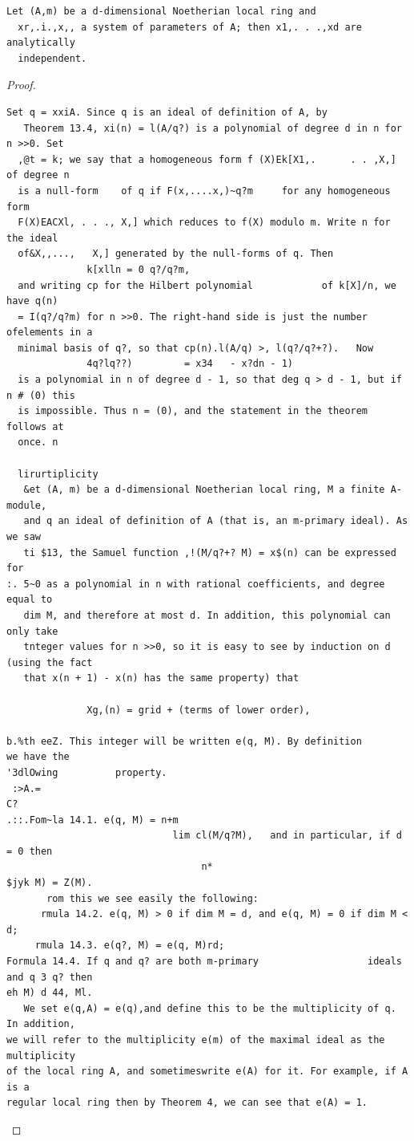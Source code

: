 \begin{theorem}\label{mcrt-auto-theorem-14-5}\uses{}
\begin{verbatim}
Let (A,m) be a d-dimensional Noetherian local ring and
  xr,.i.,x,, a system of parameters of A; then x1,. . .,xd are analytically
  independent.
\end{verbatim}
\end{theorem}
\begin{proof}
\begin{verbatim}
Set q = xxiA. Since q is an ideal of definition of A, by
   Theorem 13.4, xi(n) = l(A/q?) is a polynomial of degree d in n for n >>0. Set
  ,@t = k; we say that a homogeneous form f (X)Ek[X1,.      . . ,X,] of degree n
  is a null-form    of q if F(x,....x,)~q?m     for any homogeneous form
  F(X)EACXl, . . ., X,] which reduces to f(X) modulo m. Write n for the ideal
  of&X,,...,   X,] generated by the null-forms of q. Then
              k[xlln = 0 q?/q?m,
  and writing cp for the Hilbert polynomial            of k[X]/n, we have q(n)
  = I(q?/q?m) for n >>0. The right-hand side is just the number ofelements in a
  minimal basis of q?, so that cp(n).l(A/q) >, l(q?/q?+?).   Now
              4q?lq??)         = x34   - x?dn - 1)
  is a polynomial in n of degree d - 1, so that deg q > d - 1, but if n # (0) this
  is impossible. Thus n = (0), and the statement in the theorem follows at
  once. n

  lirurtiplicity
   &et (A, m) be a d-dimensional Noetherian local ring, M a finite A-module,
   and q an ideal of definition of A (that is, an m-primary ideal). As we saw
   ti $13, the Samuel function ,!(M/q?+? M) = x$(n) can be expressed for
:. 5~0 as a polynomial in n with rational coefficients, and degree equal to
   dim M, and therefore at most d. In addition, this polynomial can only take
   tnteger values for n >>0, so it is easy to see by induction on d (using the fact
   that x(n + 1) - x(n) has the same property) that

              Xg,(n) = grid + (terms of lower order),

b.%th eeZ. This integer will be written e(q, M). By definition       we have the
'3dlOwing          property.
 :>A.=
C?
.::.Fom~la 14.1. e(q, M) = n+m
                             lim cl(M/q?M),   and in particular, if d = 0 then
                                  n*
$jyk M) = Z(M).
       rom this we see easily the following:
      rmula 14.2. e(q, M) > 0 if dim M = d, and e(q, M) = 0 if dim M < d;
     rmula 14.3. e(q?, M) = e(q, M)rd;
Formula 14.4. If q and q? are both m-primary                   ideals and q 3 q? then
eh M) d 44, Ml.
   We set e(q,A) = e(q),and define this to be the multiplicity of q. In addition,
we will refer to the multiplicity e(m) of the maximal ideal as the multiplicity
of the local ring A, and sometimeswrite e(A) for it. For example, if A is a
regular local ring then by Theorem 4, we can see that e(A) = 1.
\end{verbatim}
\end{proof}


